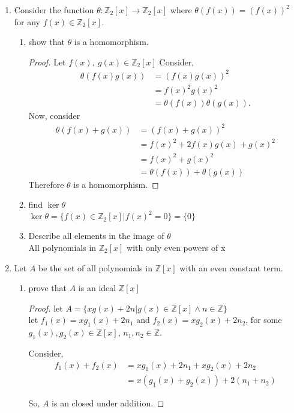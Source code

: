 \documentclass{article}
\newcommand{\Z}{\mathbb{Z}}
\begin{document}
\begin{enumerate}
		\item Consider the function $\theta: \Z_2[x] \to \Z_2[x]$ 
		where $\theta(f(x)) = (f(x))^2$ for any $f(x) \in  \Z_2[x]$.
		\begin{enumerate}
		\item show that $\theta$ is a homomorphism.
		\begin{proof}
		Let $f(x),\ g(x) \in \Z_2[x]$
		Consider, 
		\begin{align*}
			\theta(f(x)g(x))&= (f(x) g(x))^2\\
							&= f(x)^2g(x)^2\\
							&= \theta(f(x))\theta(g(x)).
		\end{align*}
		Now, consider 
		\begin{align*}
			\theta(f(x)+g(x)) &= (f(x)+g(x))^2\\ 
							&= f(x)^2 + 2f(x)g(x) +g(x)^2 \\
							&= f(x)^2+g(x)^2\\
							&= \theta(f(x))+\theta(g(x))
		\end{align*}
		Therefore $\theta$ is a homomorphism.
		\end{proof}
		\item find $\ker\theta$\\
		$\ker\theta= \{f(x)\in \Z_2[x]| f(x)^2 = 0\}= \{0\}$

		\item Describe all elements in the image of $\theta$\\ 
		All polynomials in $\Z_2[x]$ with only even powers of x
		
	\end{enumerate}
	\item Let $A$ be the set of all polynomials in $\Z[x]$ with an even constant term.
	\begin{enumerate}
		\item prove that $A$ is an ideal $\Z[x]$
		\begin{proof}
			let $A = \{ xg(x)+2n|g(x)\in \Z[x] \wedge n \in \Z \}$\\
			let $f_1(x) = xg_1(x)+2n_1$ and $f_2(x) = xg_2(x)+2n_2$, 
			for some $g_1(x), g_2(x) \in \Z[x]$, $n_1, n_2 \in \Z$. 
			
			Consider,
			\begin{align*}
				f_1(x)+f_2(x) &= xg_1(x)+2n_1+xg_2(x)+2n_2 \\
							&= x(g_1(x)+g_2(x))+2(n_1+n_2)
			\end{align*}

			So, $A$ is an closed under addition.
			

\end{proof}
\end{enumerate}
\end{enumerate}
\end{document}
